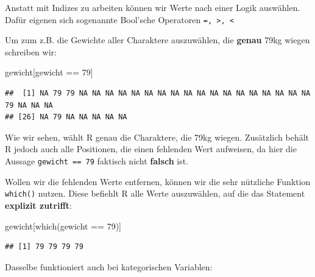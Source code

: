 \documentclass[
]{book}
\newenvironment{Shaded}{\begin{snugshade}}{\end{snugshade}}
\newcommand{\DecValTok}[1]{\textcolor[rgb]{0.00,0.00,0.81}{#1}}
\newcommand{\FunctionTok}[1]{\textcolor[rgb]{0.00,0.00,0.00}{#1}}
\newcommand{\NormalTok}[1]{#1}
\newcommand{\OtherTok}[1]{\textcolor[rgb]{0.56,0.35,0.01}{#1}}
\newcommand{\SpecialCharTok}[1]{\textcolor[rgb]{0.00,0.00,0.00}{#1}}
\begin{document}
Anstatt mit Indizes zu arbeiten können wir Werte nach einer Logik auswählen. Dafür eigenen sich sogenannte Bool'sche Operatoren \texttt{=,\ \textgreater{},\ \textless{}}

Um zum z.B. die Gewichte aller Charaktere auszuwählen, die \textbf{genau} 79kg wiegen schreiben wir:

\begin{Shaded}
\begin{Highlighting}[]
\NormalTok{gewicht[gewicht }\SpecialCharTok{==} \DecValTok{79}\NormalTok{]}
\end{Highlighting}
\end{Shaded}

\begin{verbatim}
##  [1] NA 79 79 NA NA NA NA NA NA NA NA NA NA NA NA NA NA NA NA NA NA 79 NA NA NA
## [26] NA 79 NA NA NA NA NA
\end{verbatim}

Wie wir sehen, wählt R genau die Charaktere, die 79kg wiegen. Zusätzlich behält R jedoch auch alle Positionen, die einen fehlenden Wert aufweisen, da hier die Aussage \texttt{gewicht\ ==\ 79} faktisch nicht \textbf{falsch} ist.

Wollen wir die fehlenden Werte entfernen, können wir die sehr nützliche Funktion \texttt{which()} nutzen. Diese befiehlt R alle Werte auszuwählen, auf die das Statement \textbf{explizit zutrifft}:

\begin{Shaded}
\begin{Highlighting}[]
\NormalTok{gewicht[}\FunctionTok{which}\NormalTok{(gewicht }\SpecialCharTok{==} \DecValTok{79}\NormalTok{)]}
\end{Highlighting}
\end{Shaded}

\begin{verbatim}
## [1] 79 79 79 79
\end{verbatim}

Dasselbe funktioniert auch bei kategorischen Variablen:

\begin{Shaded}
\end{Shaded}
\end{document}

